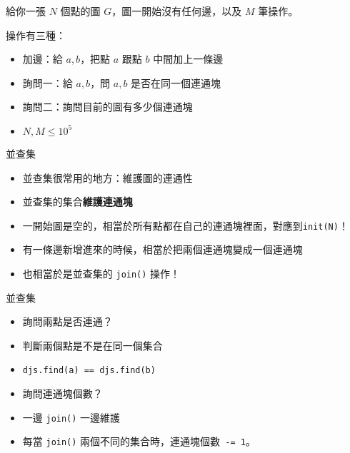 \documentclass[standalone]{beamer}
\begin{document}
\begin{frame}{}
  \begin{problem}
    給你一張 $N$ 個點的圖 $G$，圖一開始沒有任何邊，以及 $M$ 筆操作。

    操作有三種：
    \begin{itemize}
      \item 加邊：給 $a, b$，把點 $a$ 跟點 $b$ 中間加上一條邊
      \item 詢問一：給 $a, b$，問 $a, b$ 是否在同一個連通塊
      \item 詢問二：詢問目前的圖有多少個連通塊
    \end{itemize}

    \begin{itemize}
      \item $N, M \leq 10^5$
    \end{itemize}
  \end{problem}
\end{frame}

\begin{frame}{並查集}
  \begin{itemize}
    \item 並查集很常用的地方：維護圖的連通性
    \item 並查集的集合\textbf{維護連通塊}
    \item 一開始圖是空的，相當於所有點都在自己的連通塊裡面，對應到\texttt{init(N)}！
    \item 有一條邊新增進來的時候，相當於把兩個連通塊變成一個連通塊
    \item 也相當於是並查集的 \texttt{join()} 操作！
  \end{itemize}
\end{frame}

\begin{frame}{並查集}
  \begin{itemize}
    \item 詢問兩點是否連通？
    \item 判斷兩個點是不是在同一個集合
    \item \texttt{djs.find(a) == djs.find(b)}
    \item 詢問連通塊個數？
    \item 一邊 \texttt{join()} 一邊維護
    \item 每當 \texttt{join()} 兩個不同的集合時，連通塊個數\texttt{ -= 1}。
  \end{itemize}
\end{frame}
\end{document}

